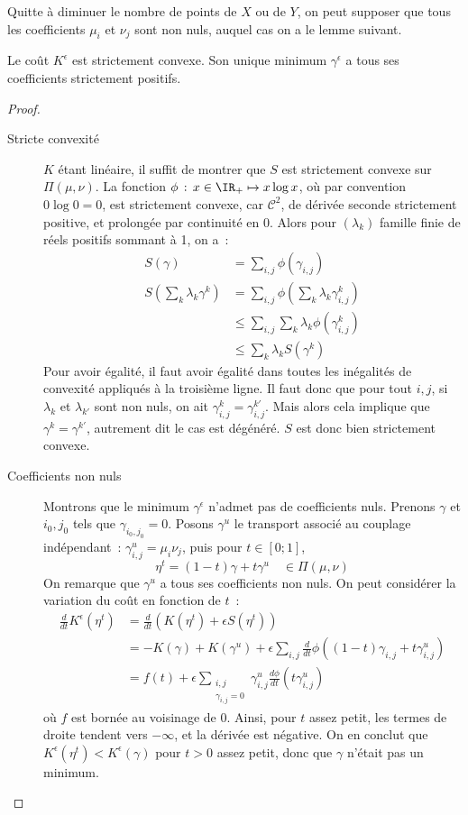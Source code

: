 Quitte à diminuer le nombre de points de $X$ ou de $Y$, on peut supposer que tous les coefficients $\mu_i$ et $\nu_j$ sont non nuls, auquel cas on a le lemme suivant.
\begin{lemma}
Le coût $K^\epsilon$ est strictement convexe. Son unique minimum $\gamma^\epsilon$ a tous ses coefficients strictement positifs.
\end{lemma}
\begin{proof}
\begin{description}
\item[Stricte convexité]
$K$ étant linéaire, il suffit de montrer que $S$ est strictement convexe sur $\Pi(\mu,\nu)$.
La fonction $\phi\,:\, x \in \IR_+ \mapsto x \log x$, où par convention $0 \log 0 = 0$, est strictement convexe, car $\mathcal{C}^2$, de dérivée seconde strictement positive, et prolongée par continuité en 0.
Alors pour $(\lambda_k)$ famille finie de réels positifs sommant à 1, on a~:
\[\begin{split}
S(\gamma) &= \sum_{i,j} \phi(\gamma_{i,j}) \\
S\left(\sum_k \lambda_k \gamma^k\right) &= \sum_{i,j} \phi\left(\sum_k \lambda_k \gamma^k_{i,j}\right) \\
& \le \sum_{i,j} \sum_{k} \lambda_k \phi\left(\gamma^k_{i,j}\right) \\
& \le \sum_{k} \lambda_k S\left(\gamma^k\right)
\end{split}\]
Pour avoir égalité, il faut avoir égalité dans toutes les inégalités de convexité appliqués à la troisième ligne. Il faut donc que pour tout $i,j$, si $\lambda_k$ et $\lambda_{k'}$ sont non nuls, on ait $\gamma_{i,j}^k = \gamma_{i,j}^{k'}$. Mais alors cela implique que $\gamma^k = \gamma^{k'}$, autrement dit le cas est dégénéré. $S$ est donc bien strictement convexe.
\item[Coefficients non nuls]
Montrons que le minimum $\gamma^\epsilon$ n'admet pas de coefficients nuls. Prenons $\gamma$ et $i_0,j_0$ tels que $\gamma_{i_0,j_0} = 0$. Posons $\gamma^u$ le transport associé au couplage indépendant~: $\gamma^u_{i,j} = \mu_i \nu_j$, puis pour $t \in [0;1]$,
\[ \eta^t = (1-t) \gamma + t \gamma^u \quad \in \Pi(\mu,\nu)\]
On remarque que $\gamma^u$ a tous ses coefficients non nuls. On peut considérer la variation du coût en fonction de $t$~:
\[\begin{split}
\frac{d}{dt} K^\epsilon(\eta^t) &= \frac{d}{dt}\left( K(\eta^t) + \epsilon S(\eta^t) \right) \\
& = - K(\gamma) + K(\gamma^u) + \epsilon \sum_{i,j} \frac{d}{dt} \phi((1-t) \gamma_{i,j} + t \gamma^u_{i,j}) \\
& = f(t) + \epsilon \sum_{\substack{i,j \\ \gamma_{i,j} = 0}} \gamma^u_{i,j}\frac{d\phi}{dt}(t \gamma^u_{i,j}) 
\end{split}\]
où $f$ est bornée au voisinage de 0. Ainsi, pour $t$ assez petit, les termes de droite tendent vers $-\infty$, et la dérivée est négative. On en conclut que $K^\epsilon(\eta^t) < K^\epsilon(\gamma)$ pour $t>0$ assez petit, donc que $\gamma$ n'était pas un minimum.
\end{description}
\end{proof}

